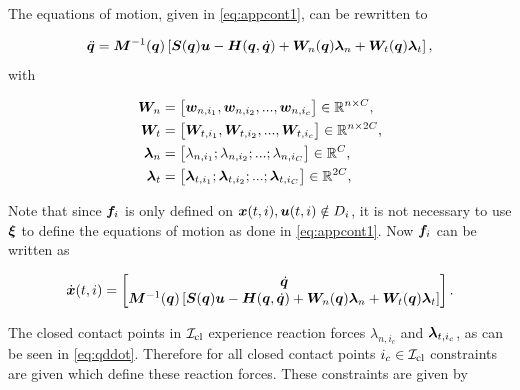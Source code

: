 \documentclass[../DC2017114Bouma.tex]{subfiles}
\begin{document}
The equations of motion, given in \eqref{eq:appcont1}, can be rewritten to

\begin{align}
\ddot{{\boldsymbol{q}}} = {\boldsymbol{M}}^{-1}({\boldsymbol{q}})\left[ {\boldsymbol{S}}({\boldsymbol{q}}){\boldsymbol{u}} - {\boldsymbol{H}}({\boldsymbol{q}},\dot{{\boldsymbol{q}}}) + {\boldsymbol{W}}_{n}({\boldsymbol{q}})\boldsymbol{\lambda}_{n} + {\boldsymbol{W}}_{t}({\boldsymbol{q}})\boldsymbol{\lambda}_{t}\right],\label{eq:qddot}
\end{align}
with

\begin{align}
{\boldsymbol{W}}_n &= \begin{bmatrix}
{\boldsymbol{w}}_{n,i_1},{\boldsymbol{w}}_{n,i_2},...,{\boldsymbol{w}}_{n,i_c}
\end{bmatrix}\in\mathbb{R}^{n\times C},\\
{\boldsymbol{W}}_t &= \begin{bmatrix}
{\boldsymbol{W}}_{t,i_1},{\boldsymbol{W}}_{t,i_2},...,{\boldsymbol{W}}_{t,i_c} 
\end{bmatrix}\in\mathbb{R}^{n\times 2C},\\
\boldsymbol{\lambda}_n &= \begin{bmatrix}
\lambda_{n,i_1};\lambda_{n,i_2};...;\lambda_{n,i_C} 
\end{bmatrix}\in\mathbb{R}^{C},\\
\boldsymbol{\lambda}_t &= \begin{bmatrix}
\boldsymbol{\lambda}_{t,i_1};\boldsymbol{\lambda}_{t,i_2};...;\boldsymbol{\lambda}_{t,i_C} 
\end{bmatrix}\in\mathbb{R}^{2C},
\end{align}

Note that since ${\boldsymbol{f}}_i$ is only defined on ${\boldsymbol{x}}(t,i),{\boldsymbol{u}}(t,i)\notin D_i$, it is not necessary to use $\boldsymbol{\xi}$ to define the equations of motion as done in \eqref{eq:appcont1}. Now ${\boldsymbol{f}}_i$ can be written as

\begin{align}
\dot{{\boldsymbol{x}}}(t,i) =\begin{bmatrix}
\dot{{\boldsymbol{q}}}\\ {\boldsymbol{M}}^{-1}({\boldsymbol{q}})\left[ {\boldsymbol{S}}({\boldsymbol{q}}){\boldsymbol{u}} - {\boldsymbol{H}}({\boldsymbol{q}},\dot{{\boldsymbol{q}}}) + {\boldsymbol{W}}_{n}({\boldsymbol{q}})\boldsymbol{\lambda}_{n} + {\boldsymbol{W}}_{t}({\boldsymbol{q}})\boldsymbol{\lambda}_{t}\right]
\end{bmatrix}.\label{eq:fcont}
\end{align}

The closed contact points in $\mathcal{I}_{\text{cl}}$ experience reaction forces $\lambda_{n,i_c}$ and $\boldsymbol{\lambda}_{t,i_c}$, as can be seen in \eqref{eq:qddot}. Therefore for all closed contact points $i_c\in\mathcal{I}_{\text{cl}}$ constraints are given which define these reaction forces. These constraints are given by
\end{document}
